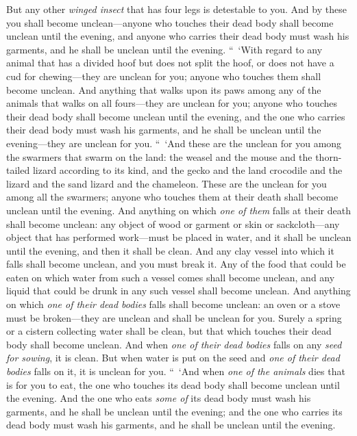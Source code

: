\begin{biblechapter}
\verse But any other \textit{winged insect} that has four legs is detestable to you.
\verse And by these you shall become unclean—anyone who touches their dead body shall become unclean until the evening,
\verse and anyone who carries their dead body must wash his garments, and he shall be unclean until the evening.
\verse “ ‘With regard to any animal that has a divided hoof but does not split the hoof, or does not have a cud for chewing—they are unclean for you; anyone who touches them shall become unclean.
\verse And anything that walks upon its paws among any of the animals that walks on all fours—they are unclean for you; anyone who touches their dead body shall become unclean until the evening,
\verse and the one who carries their dead body must wash his garments, and he shall be unclean until the evening—they are unclean for you.
\verse “ ‘And these are the unclean for you among the swarmers that swarm on the land: the weasel and the mouse and the thorn-tailed lizard according to its kind,
\verse and the gecko and the land crocodile and the lizard and the sand lizard and the chameleon.
\verse These are the unclean for you among all the swarmers; anyone who touches them at their death shall become unclean until the evening.
\verse And anything on which \textit{one of them} falls at their death shall become unclean: any object of wood or garment or skin or sackcloth—any object that has performed work—must be placed in water, and it shall be unclean until the evening, and then it shall be clean.
\verse And any clay vessel into which it falls shall become unclean, and you must break it.
\verse Any of the food that could be eaten on which water from such a vessel comes shall become unclean, and any liquid that could be drunk in any such vessel shall become unclean.
\verse And anything on which \textit{one of their dead bodies} falls shall become unclean: an oven or a stove must be broken—they are unclean and shall be unclean for you.
\verse Surely a spring or a cistern collecting water shall be clean, but that which touches their dead body shall become unclean.
\verse And when \textit{one of their dead bodies} falls on any \textit{seed for sowing}, it is clean.
\verse But when water is put on the seed and \textit{one of their dead bodies} falls on it, it is unclean for you.
\verse “ ‘And when \textit{one of the animals} dies that is for you to eat, the one who touches its dead body shall become unclean until the evening.
\verse And the one who eats \textit{some of} its dead body must wash his garments, and he shall be unclean until the evening; and the one who carries its dead body must wash his garments, and he shall be unclean until the evening.

\end{biblechapter}
